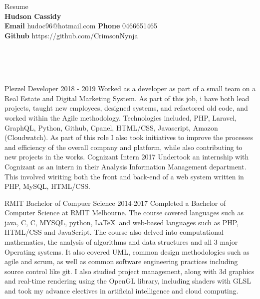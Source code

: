 \documentclass[9pt]{developercv}
\newcommand{\CC}{C\nolinebreak\hspace{-.05em}\raisebox{.4ex}{\tiny\bf +}\nolinebreak\hspace{-.10em}\raisebox{.4ex}{\tiny\bf +}}
\def\CC{{C\nolinebreak[4]\hspace{-.05em}\raisebox{.4ex}{\tiny\bf ++}}}
\begin{document}
	\begin{minipage}[a]{1.0\textwidth}
		\begin{center}
			{\HUGE Resume}\\
			\textbf {Hudson Cassidy} \\
			\textbf {Email} hudoc96@hotmail.com
			\textbf {Phone} 0466651465 \\
			\textbf {Github} https://github.com/CrimsonNynja \\
		\end{center}
	\end{minipage}
	\\
	\\
	\\
	\begin{minipage}[t]{0.6\textwidth}
		\begin{entrylist}
			\entry
				{Plezzel}
				{Developer}
				{2018 - 2019}
				{Worked as a developer as part of a small team on a Real Estate and Digital Marketing System. As part of this job, i have both lead projects, taught new employees, designed systems, and refactored old code, and worked within the Agile methodology. Technologies included, PHP, Laravel, GraphQL, Python, Github, Cpanel, HTML/CSS, Javascript, Amazon (Cloudwatch). As part of this role I also took initiatives to improve the processes and efficiency of the overall company and platform, while also contributing to new projects in the works.}
			\entry
				{Cognizant}
				{Intern}
				{2017}
				{Undertook an internship with Cognizant as an intern in their Analysis Information Management department. This involved wiriting both the front and back-end of a web system written in PHP, MySQL, HTML/CSS.}
		\end{entrylist}	
		\cvsect{Education}
		\begin{entrylist}
			\entry
				{RMIT}
				{Bachelor of Compuer Science}
				{2014-2017}
				{Completed a Bachelor of Computer Science at RMIT Melbourne. The course covered languages such as java, C, \CC, MYSQL, python, \LaTeX  \  and web-based languages such as PHP, HTML/CSS and JavaScript. The course also delved into computational mathematics, the analysis of algorithms and data structures and all 3 major Operating systems. It also covered UML, common design methodologies such as agile and scrum, as well as common software engineering practices including source control like git. I also studied project management, along with 3d graphics and real-time rendering using the OpenGL library, including shaders with GLSL and took my advance electives in artificial intelligence and cloud computing.}

\end{entrylist}
\end{minipage}
\end{document}
